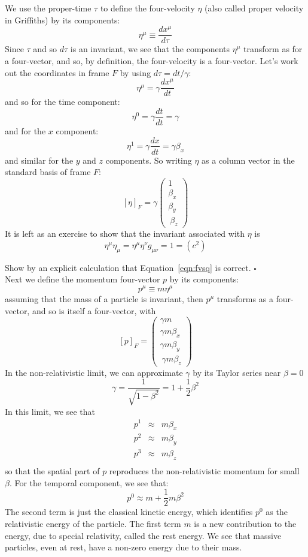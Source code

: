 \documentclass[12pt]{article}
\begin{document}
We use the proper-time $\tau$ to define the four-velocity $\eta$ (also
called proper velocity in Griffiths) by its components:
\begin{equation}
\eta^\mu \equiv \frac{dx^\mu}{d\tau}
\end{equation}
Since $\tau$ and so $d\tau$ is an invariant, we see that the components $\eta^\mu$
transform as for a four-vector, and so, by definition, the four-velocity is a four-vector.  Let's work out the coordinates in frame $F$ by using $d\tau = dt/\gamma$:
$$\eta^\mu = \gamma \frac{dx^\mu}{dt}$$
and so for the time component:
$$\eta^0 = \gamma \frac{dt}{dt} = \gamma$$
and for the $x$ component:
$$\eta^1 = \gamma \frac{dx}{dt} = \gamma \beta_x$$
and similar for the $y$ and $z$ components.  So writing $\eta$
as a column vector in the standard basis of frame $F$:
$$[\eta]_F = \gamma \begin{pmatrix} 1 \\ \beta_x \\ \beta_y \\\ \beta_z \end{pmatrix}$$
It is left as an exercise to show that the invariant associated with $\eta$ is
\begin{equation}
\label{eqn:fvsq}
\eta^\mu \eta_\mu = \eta^\mu \eta^\nu g_{\mu \nu} = 1 = (c^2)
\end{equation}

\exercise Show by an explicit calculation that Equation~\ref{eqn:fvsq} is correct. $\square$\\[3pt]

Next we define the momentum four-vector $p$ by its components:
\begin{equation}
p^\mu \equiv m \eta^\mu
\end{equation}
assuming that the mass of a particle is invariant, then $p^\mu$ transforms as a four-vector, and so is itself a four-vector, with
$$[p]_F = \begin{pmatrix} \gamma m \\ \gamma m \beta_x \\ \gamma m \beta_y \\\ \gamma m \beta_z \end{pmatrix}$$
In the non-relativistic limit, we can approximate $\gamma$ by its Taylor series near $\beta=0$
$$\gamma = \frac{1}{\sqrt{1-\beta^2}} = 1 + \frac{1}{2} \beta^2$$
In this limit, we see that
\begin{eqnarray*}
  p^1 &\approx& m \beta_x \\
  p^2 &\approx& m \beta_y \\
  p^3 &\approx& m \beta_z \\
\end{eqnarray*}
so that the spatial part of $p$ reproduces the non-relativistic
momentum for small $\beta$.  For the temporal component, we see that:
$$p^0  \approx m + \frac{1}{2} m \beta^2$$
The second term is just the classical kinetic energy, which identifies
$p^0$ as the relativistic energy of the particle.  The first term
$m$ is a new contribution to the energy, due to special relativity,
called the rest energy.  We see that massive particles, even at rest,
have a non-zero energy due to their mass.
\end{document}
